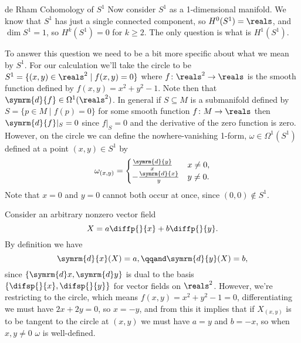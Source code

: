 \documentclass[fleqn]{NotesClass}
\renewcommand{\dl}{\symrm{d}}
\begin{document}
    \begin{exm}{de Rham Cohomology of \(S^1\)}{}
        Now consider \(S^1\) as a 1-dimensional manifold.
        We know that \(S^1\) has just a single connected component, so \(H^0(S^1) = \reals\), and \(\dim S^1 = 1\), so \(H^k(S^1) = 0\) for \(k \ge 2\).
        The only question is what is \(H^1(S^1)\).
        
        To answer this question we need to be a bit more specific about what we mean by \(S^1\).
        For our calculation we'll take the circle to be \(S^1 = \{(x, y) \in \reals^2 \mid f(x, y) = 0\}\) where \(f \colon \reals^2 \to \reals\) is the smooth function defined by \(f(x, y) = x^2 + y^2 - 1\).
        Note then that \(\dl{f} \in \Omega^1(\reals^2)\).
        In general if \(S \subseteq M\) is a submanifold defined by \(S = \{p \in M \mid f(p) = 0\}\) for some smooth function \(f \colon M \to \reals\) then \(\dl{f}|_S = 0\) since \(f|_S = 0\) and the derivative of the zero function is zero.
        However, on the circle we can define the nowhere-vanishing 1-form, \(\omega \in \Omega^1(S^1)\) defined at a point \((x, y) \in S^1\) by
        \begin{equation}
            \omega_{(x, y)} =
            \begin{cases}
                \frac{\dl{y}}{x} & x \ne 0,\\
                -\frac{\dl{x}}{y} & y \ne 0.
            \end{cases}
        \end{equation}
        Note that \(x = 0\) and \(y = 0\) cannot both occur at once, since \((0, 0) \notin S^1\).
        
        Consider an arbitrary nonzero vector field
        \begin{equation}
            X = a \diffp{}{x} + b \diffp{}{y}.
        \end{equation}
        By definition we have
        \begin{equation}
            \dl{x}(X) = a, \qqand \dl{y}(X) = b,
        \end{equation}
        since \(\{\dl x, \dl y\}\) is dual to the basis \(\{\difsp{}{x}, \difsp{}{y}\}\) for vector fields on \(\reals^2\).
        However, we're restricting to the circle, which means \(f(x, y) = x^2 + y^2 - 1 = 0\), differentiating we must have \(2x + 2y = 0\), so \(x = -y\), and from this it implies that if \(X_{(x, y)}\) is to be tangent to the circle at \((x, y)\) we must have \(a = y\) and \(b = -x\), so when \(x, y \ne 0\) \(\omega\) is well-defined.
        

\end{exm}
\end{document}
